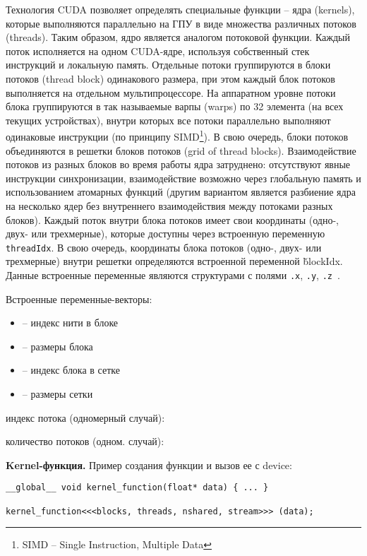 Технология CUDA позволяет определять специальные функции – ядра (kernels), которые выполняются параллельно на ГПУ в виде множества различных потоков (threads). Таким образом, ядро является аналогом потоковой функции. Каждый поток исполняется на одном CUDA-ядре, используя собственный стек инструкций и локальную память. Отдельные потоки группируются в блоки потоков (thread block) одинакового размера, при этом каждый блок потоков выполняется на отдельном мультипроцессоре.
На аппаратном уровне потоки блока группируются в так называемые варпы (warps) по 32 элемента (на всех текущих устройствах), внутри которых все потоки параллельно выполняют одинаковые инструкции (по принципу SIMD\footnote{SIMD -- Single Instruction, Multiple Data}).
В свою очередь, блоки потоков объединяются в решетки блоков потоков (grid of thread blocks). Взаимодействие потоков из разных блоков во время работы ядра затруднено: отсутствуют явные инструкции синхронизации, взаимодействие возможно через глобальную память и использованием атомарных функций (другим вариантом является разбиение ядра на несколько ядер без внутреннего взаимодействия между потоками разных блоков).
Каждый поток внутри блока потоков имеет свои координаты (одно-, двух- или трехмерные), которые доступны через встроенную переменную \texttt{threadIdx}. В свою очередь, координаты блока потоков (одно-, двух- или трехмерные) внутри решетки определяются встроенной переменной \v{blockIdx}. Данные встроенные переменные являются структурами с полями \texttt{.x}, \texttt{.y}, \texttt{.z}~\cite{DenisenkoSatanin2012}.

Встроенные переменные-векторы:
\begin{itemize}
    \item{} -- индекс нити в блоке
    \item{} -- размеры блока
    \item{} -- индекс блока в сетке
    \item{} -- размеры сетки
\end{itemize}

 индекс потока (одномерный случай): 

 количество потоков (одном. случай): 

\textbf{Kernel-функция.} Пример создания функции и вызов ее с device:
\begin{verbatim}
__global__ void kernel_function(float* data) { ... }

kernel_function<<<blocks, threads, nshared, stream>>> (data);
\end{verbatim}

